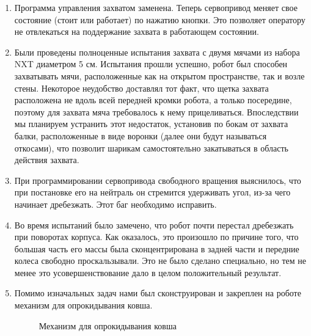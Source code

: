 \begin{enumerate}
\begin{enumerate}
      \item Программа управления захватом заменена. Теперь сервопривод меняет свое состояние (стоит или работает) по нажатию кнопки. Это позволяет оператору не отвлекаться на поддержание захвата в работающем состоянии.
      
      \item Были проведены полноценные испытания захвата с двумя мячами из набора NXT диаметром 5 см. Испытания прошли успешно, робот был способен захватывать мячи, расположенные как на открытом пространстве, так и возле стены. Некоторое неудобство доставлял тот факт, что щетка захвата расположена не вдоль всей передней кромки робота, а только посередине, поэтому для захвата мяча требовалось к нему прицеливаться. Впоследствии мы планируем устранить этот недостаток, установив по бокам от захвата балки, расположенные в виде воронки (далее они будут называться откосами), что позволит шарикам самостоятельно закатываться в область действия захвата.
      
      \item При программировании сервопривода свободного вращения выяснилось, что при постановке его на нейтраль он стремится удерживать угол, из-за чего начинает дребезжать. Этот баг необходимо исправить.
      
      \item Во время испытаний было замечено, что робот почти перестал дребезжать при поворотах корпуса. Как оказалось, это произошло по причине того, что большая часть его массы была сконцентрирована в задней части и передние колеса свободно проскальзывали. Это не было сделано специально, но тем не менее это усовершенствование дало в целом положительный результат.
      
      \item Помимо изначальных задач нами был сконструирован и закреплен на роботе механизм для опрокидывания ковша.
      
      \begin{figure}[H]
      	\begin{minipage}[h]{1\linewidth}
      		\caption{Механизм для опрокидывания ковша}
      	\end{minipage}
      \end{figure}
      

\end{enumerate}
\end{enumerate}
